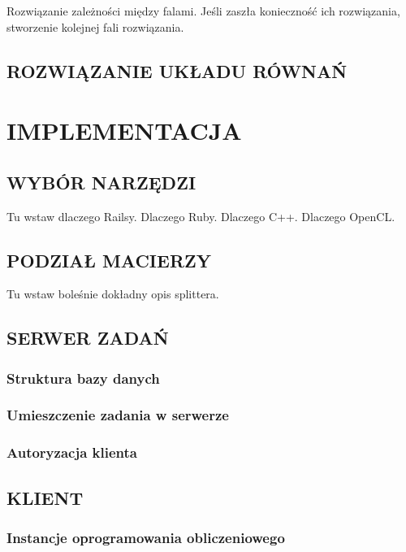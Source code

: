 \documentclass[12pt,a4paper,twoside]{article}
\begin{document}
Rozwiązanie zależności między falami. Jeśli zaszła konieczność ich rozwiązania, stworzenie kolejnej fali rozwiązania.

\subsection{ROZWIĄZANIE UKŁADU RÓWNAŃ}

\section{IMPLEMENTACJA}

\subsection{WYBÓR NARZĘDZI}

Tu wstaw dlaczego Railsy. Dlaczego Ruby. Dlaczego C++. Dlaczego OpenCL.

\subsection{PODZIAŁ MACIERZY}

Tu wstaw boleśnie dokładny opis splittera.


\subsection{SERWER ZADAŃ}

\subsubsection{Struktura bazy danych}

\subsubsection{Umieszczenie zadania w serwerze}

\subsubsection{Autoryzacja klienta}

\subsection{KLIENT}

\subsubsection{Instancje oprogramowania obliczeniowego}
\end{document}

